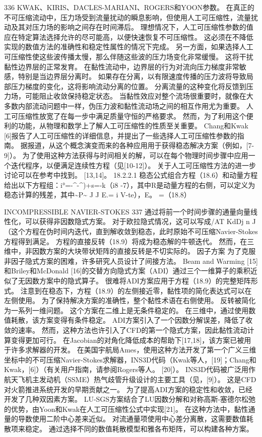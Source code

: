 \documentclass[UTF8,11pt,a4paper,openany,fontset=fandol]{ctexbook}
\begin{document}
336 KWAK、KIRIS、DACLES-MARIANI、ROGERS和YOON参数。 在真正的不可压缩流动中，压力场受到流量扰动的瞬息影响，但使用人工可压缩性，流量扰动及其对压力场的影响之间存在时间滞后。 理想情况下，人工可压缩性参数的值应在特定算法选择允许的尽可能高，以便快速恢复不可压缩性。 这必须在不降低实现的数值方法的准确性和稳定性属性的情况下完成。 另一方面，如果选择人工可压缩性使这些波传播太慢，那么伴随这些波的压力场变化非常缓慢。 这将干扰黏性边界层的正常发育。 在黏性流动中，边界层的行为对流向压力梯度非常敏感，特别是当边界层分离时。 如果存在分离，以有限速度传播的压力波将导致局部压力梯度的变化，这将影响流动分离的位置。 分离流量的这种变化将反馈到压力场，可能阻止收敛保持稳定状态。 当黏性效应对整个流场很重要时，就像在大多数内部流动问题中一样，伪压力波和黏性流动场之间的相互作用尤为重要。 人工可压缩性放宽了在每一步中满足质量守恒的严格要求。 然而，为了利用这个便利的功能，从物理和数学上了解人工可压缩性的性质至关重要。 Chang和Kwak [6]报告了人工可压缩性的详细信息，并提出了一些选择人工可压缩性参数的指南。 据报道，从这个概念演变而来的各种应用用于获得稳态解决方案（例如，[7-9]）。 为了使用这种方法获得与时间相关的解，可以在每个物理时间步骤中应用一个迭代程序，以便满足连续性方程（见[10-12]）。 关于人工可压缩性方法的进一步讨论可以在参考中找到。 [13,14]。 18.2.2.1 稳态公式组合方程（18.6）和动量方程给出以下方程组：i°=-\textasciicircum{}-\textasciicircum{})+s=-k（i8 -7），其中R是动量方程的右侧，可以定义为稳态计算的残差，其中\textasciitilde{}P\textasciitilde{} J J E.= i V-te），E。 =（18.8）

INCOMPRESSIBLE NAVIER-STOKES 337 通过将前一个时间步骤的通量向量线性化，可以获得非因数隐式方案。 对于欧拉隐式情况，这可以写成/AT KdDj n J（这个方程在伪时间内迭代，直到解收敛到稳态，此时原始不可压缩Navier-Stokes 方程得到满足。 方程的直接反转（18.9）将成为稳态解的牛顿迭代。 然而，在三维中，非因数方案的大块带状矩阵的直接反转是不切实际的。 因子方案 为了克服非因子隐式方案的困难，许多研究人员设计了间接方法。 Beam and Warming [15]和Briley和McDonald [16]的交替方向隐式方案（ADI）通过三个一维算子的乘积近似了无因数方案中的隐式算子。 很难将ADI方案应用于方程（18.9）的完整矩阵形式。 注意到在稳态下，方程（18.9）的左侧接近零，黏性项的简化表达式可以在左侧使用。 为了保持解决方案的准确性，整个黏性术语在右侧使用。 反转被简化为一系列一维问题。 这个方案在二维上是无条件稳定的。 在三维中，通过使用数值耗散，该方案变得有条件稳定。 ADI方案引入了一个因数分解误差，降低了收敛的速率。 然而，这种方法也许引入了CFD的第一个隐式方案，因此黏性流动计算变得更加可行。 在Jacobian的对角化降低成本的帮助下[17,18]，该方案已被用于许多求解器的开发。 在美国宇航局Ames，使用这种方法开发了第一个广义三维坐标中的不可压缩Navier-Stokes求解器，INS3D代码（Kwak等人，[19]；Chang和Kwak，[6]）（有关用户指南，请参阅Rogers等人。 [20]）。 INS3D代码被广泛用作航天飞机主发动机（SSME）热气歧管升级设计的主要工具（见，[9]）。 这是CFD对火箭推进系统开发的早期贡献之一。 为了提高ADI方案的稳定性和收敛，已经开发了几种双因素方案。 LU-SGS方案结合了LU因数分解和对称高斯-塞德尔松弛的优势，由Yoon和Kwak在人工可压缩性公式中实现[21]。 在这种方法中，黏性通量的导数使用二阶中心差来近似。 对流通量项使用中心差分离散，这需要数值耗散项来稳定。 通过选择不同的数值耗散模型和雅各布矩阵，可以构建各种方案。
\end{document}
